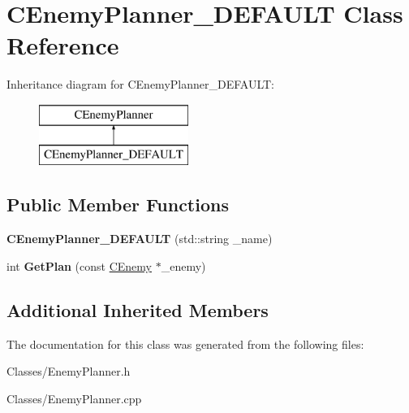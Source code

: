 \hypertarget{class_c_enemy_planner___d_e_f_a_u_l_t}{}\section{C\+Enemy\+Planner\+\_\+\+D\+E\+F\+A\+U\+LT Class Reference}
\label{class_c_enemy_planner___d_e_f_a_u_l_t}
Inheritance diagram for C\+Enemy\+Planner\+\_\+\+D\+E\+F\+A\+U\+LT\+:\begin{figure}[H]
\begin{center}
\leavevmode
\includegraphics[height=2.000000cm]{class_c_enemy_planner___d_e_f_a_u_l_t}
\end{center}
\end{figure}
\subsection*{Public Member Functions}
\begin{DoxyCompactItemize}
\item 
{\bfseries C\+Enemy\+Planner\+\_\+\+D\+E\+F\+A\+U\+LT} (std\+::string \+\_\+name)\hypertarget{class_c_enemy_planner___d_e_f_a_u_l_t_ae95fc05ddfd1e98343c3feff51578153}{}\label{class_c_enemy_planner___d_e_f_a_u_l_t_ae95fc05ddfd1e98343c3feff51578153}

\item 
int {\bfseries Get\+Plan} (const \hyperlink{class_c_enemy}{C\+Enemy} $\ast$\+\_\+enemy)\hypertarget{class_c_enemy_planner___d_e_f_a_u_l_t_a7e5c3c4b12842793c429d6a2d08c824d}{}\label{class_c_enemy_planner___d_e_f_a_u_l_t_a7e5c3c4b12842793c429d6a2d08c824d}

\end{DoxyCompactItemize}
\subsection*{Additional Inherited Members}


The documentation for this class was generated from the following files\+:\begin{DoxyCompactItemize}
\item 
Classes/Enemy\+Planner.\+h\item 
Classes/Enemy\+Planner.\+cpp\end{DoxyCompactItemize}
